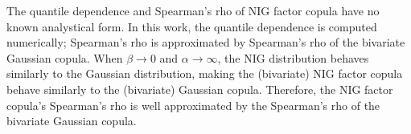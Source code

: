 The quantile dependence and Spearman's rho of NIG factor copula have no known analystical form.
In this work, the quantile dependence is computed numerically; 
Spearman's rho is approximated by Spearman's rho of the bivariate Gaussian copula. 
When $\beta \rightarrow 0$ and $\alpha \rightarrow \infty$, the NIG
distribution behaves similarly to the Gaussian distribution, 
making the (bivariate) NIG factor copula behave similarly to the
(bivariate) Gaussian copula. 
Therefore, the NIG factor copula's Spearman's rho is well approximated by the Spearman's rho of the bivariate Gaussian copula.






